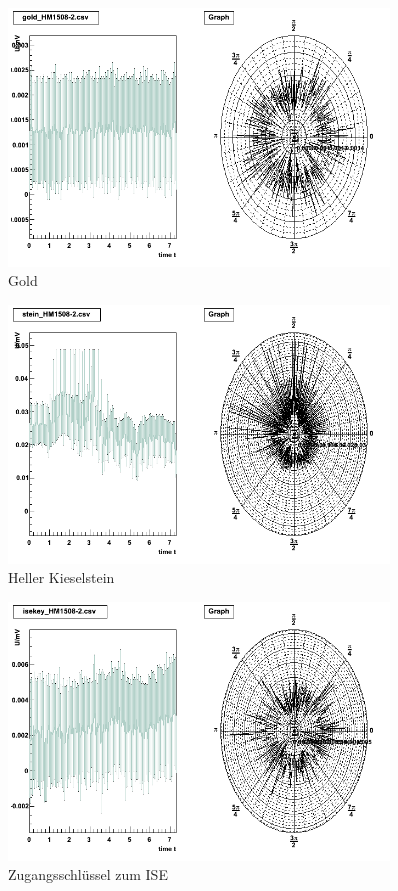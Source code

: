 \begin{appendix}
\begin{figure}[H]
	\centering \includegraphics[width=0.9\textwidth]{Auswertung/Proben-polar/gold.png}
	\caption{Gold}
\end{figure}

\begin{figure}[H]
	\centering \includegraphics[width=0.9\textwidth]{Auswertung/Proben-polar/stein.png}
	\caption{Heller Kieselstein}
\end{figure}

\begin{figure}[H]
	\centering \includegraphics[width=0.9\textwidth]{Auswertung/Proben-polar/isekey.png}
	\caption{Zugangsschlüssel zum ISE}
\end{figure}


\end{appendix}
